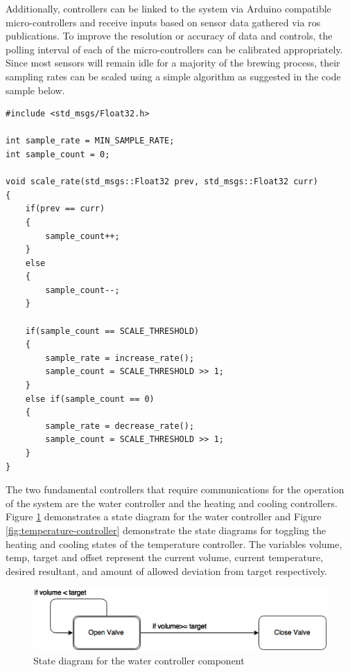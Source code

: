\documentclass{article}
\begin{document}
Additionally, controllers can be linked to the system via Arduino compatible micro-controllers and receive inputs based on sensor data gathered via \gls{ros} publications.  To improve the resolution or accuracy of data and controls, the polling interval of each of the micro-controllers can be calibrated appropriately.  Since most sensors will remain idle for a majority of the brewing process, their sampling rates can be scaled using a simple algorithm as suggested in the code sample below.

\begin{lstlisting}
#include <std_msgs/Float32.h>

int sample_rate = MIN_SAMPLE_RATE;
int sample_count = 0;

void scale_rate(std_msgs::Float32 prev, std_msgs::Float32 curr)
{
    if(prev == curr)
    {
        sample_count++;
    }
    else
	{
        sample_count--;
	}

	if(sample_count == SCALE_THRESHOLD)
	{
   		sample_rate = increase_rate();
    	sample_count = SCALE_THRESHOLD >> 1;
	}
	else if(sample_count == 0)
	{
    	sample_rate = decrease_rate();
    	sample_count = SCALE_THRESHOLD >> 1;
	}
}
\end{lstlisting}

The two fundamental controllers that require communications for the operation of the system are the water controller and the heating and cooling controllers.  Figure \ref{fig:water-controller} demonstrates a state diagram for the water controller and Figure \ref{fig:temperature-controller} demonstrate the state diagrams for toggling the heating and cooling states of the temperature controller.  The variables volume, temp, target and offset represent the current volume, current temperature, desired resultant, and amount of allowed deviation from target respectively.

\begin{figure}[H]
\begin{center}
\includegraphics[scale=0.50]{water-controller-state-diagram.png}
\caption{State diagram for the water controller component}
\label{fig:water-controller}
\end{center}
\end{figure}
\end{document}
